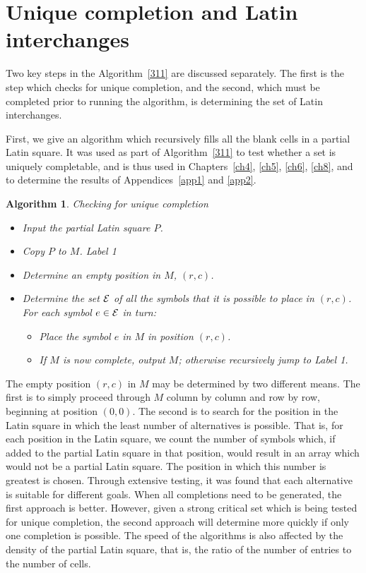 \documentclass[12pt]{report}
\newtheorem{algorithm}{Algorithm}
\begin{document}
\section{Unique completion and Latin interchanges}
Two key steps in the Algorithm~\ref{311} are discussed separately.
The first is the step which checks for unique completion, and the
second, which must be completed prior to running the algorithm,
is determining the set of Latin interchanges.  


First, we give an algorithm which recursively fills all the blank cells
in a partial Latin square.  It was used as part of Algorithm~\ref{311}
to test whether a set is uniquely completable, and is thus used
in Chapters~\ref{ch4}, \ref{ch5}, \ref{ch6}, \ref{ch8}, and to determine the results of Appendices~\ref{app1} and \ref{app2}.

\begin{algorithm}{Checking for unique completion}
\label{323}
\begin{itemize}
\item Input the partial Latin square $P$.
\item Copy $P$ to $M$.
\newline 
\noindent Label 1
\item Determine an empty position in $M$, $(r,c)$.
\item Determine the set $\cal{E}$ of all the symbols that it is possible to place in $(r,c)$.
\newline
For each symbol $e \in \cal{E}$ in turn:
\begin{itemize}
\item Place the symbol $e$ in $M$ in position $(r,c)$.
\item If $M$ is now complete, output $M$; otherwise recursively jump to Label 1.
\end{itemize}
\end{itemize}
\end{algorithm}

The empty position $(r,c)$ in $M$ may be determined by two different means.  The
first is to simply proceed through $M$ column by column and row
by row, beginning at position $(0,0)$.  The second is to search for
the position in the Latin square in which the least number of alternatives
is possible.  That is, for each position in the Latin square, we
count the number of symbols which, if added to the partial Latin square
in that position, would result in an array which would not be a partial
Latin square.  The position in which this number is greatest is
chosen.  Through extensive testing, it was found that each alternative  is suitable for
different goals.  When all completions need to be generated, the first
approach is better.  However, given a strong critical set which is
being tested for unique completion, the second approach will determine
more quickly if only one completion is possible.  The speed of
the algorithms is also affected by the density of the partial Latin square,
that is, the ratio of the number of entries to the number of cells.
\end{document}
